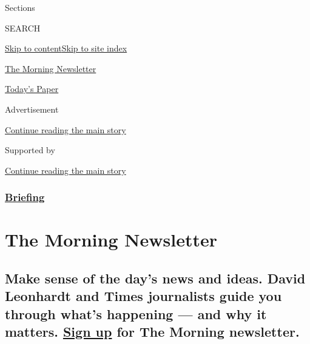 Sections

SEARCH

\protect\hyperlink{site-content}{Skip to
content}\protect\hyperlink{site-index}{Skip to site index}

\href{https://www.nytimes3xbfgragh.onion/series/us-morning-briefing}{The
Morning Newsletter}

\href{https://myaccount.nytimes3xbfgragh.onion/auth/login?response_type=cookie\&client_id=vi}{}

\href{https://www.nytimes3xbfgragh.onion/section/todayspaper}{Today's
Paper}

Advertisement

\protect\hyperlink{after-top}{Continue reading the main story}

Supported by

\protect\hyperlink{after-sponsor}{Continue reading the main story}

\hypertarget{briefing}{%
\subsubsection{\texorpdfstring{\href{/interactive/2018/briefing/global-morning-briefing-newsletter-signup.html}{Briefing}}{Briefing}}\label{briefing}}

\hypertarget{the-morning-newsletter}{%
\section{The Morning Newsletter}\label{the-morning-newsletter}}

\hypertarget{make-sense-of-the-days-news-and-ideas-david-leonhardt-and-times-journalists-guide-you-through-whats-happening--and-why-it-matters-sign-up-for-the-morning-newsletter}{%
\subsection{\texorpdfstring{Make sense of the day's news and ideas.
David Leonhardt and Times journalists guide you through what's happening
--- and why it matters.
\href{https://www.nytimes3xbfgragh.onion/newsletters/morning-briefing}{Sign
up} for The Morning
newsletter.}{Make sense of the day's news and ideas. David Leonhardt and Times journalists guide you through what's happening --- and why it matters. Sign up for The Morning newsletter.}}\label{make-sense-of-the-days-news-and-ideas-david-leonhardt-and-times-journalists-guide-you-through-whats-happening--and-why-it-matters-sign-up-for-the-morning-newsletter}}

